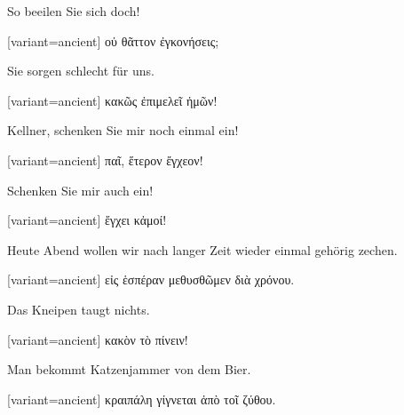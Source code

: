 So beeilen Sie sich doch!

\switchcolumn

\begin{greek}[variant=ancient]%
οὐ θᾶττον ἐγκονήσεις;

\end{greek}%
\switchcolumn*

Sie sorgen schlecht für uns.

\switchcolumn

\begin{greek}[variant=ancient]%
κακῶς ἐπιμελεῖ ἡμῶν!

\end{greek}%
\switchcolumn*

Kellner, schenken Sie mir noch einmal ein!

\switchcolumn

\begin{greek}[variant=ancient]%
παῖ, ἕτερον ἔγχεον!

\end{greek}%
\switchcolumn*

Schenken Sie mir auch ein!

\switchcolumn

\begin{greek}[variant=ancient]%
ἔγχει κἀμοί!

\end{greek}%
\switchcolumn*

Heute Abend wollen wir nach langer Zeit wieder einmal gehörig zechen.

\switchcolumn

\begin{greek}[variant=ancient]%
εἰς ἑσπέραν μεθυσθῶμεν διὰ χρόνου.

\end{greek}%
\switchcolumn*

Das Kneipen taugt nichts.

\switchcolumn

\begin{greek}[variant=ancient]%
κακὸν τὸ πίνειν!

\end{greek}%
\switchcolumn*

Man bekommt Katzenjammer von dem Bier.

\switchcolumn

\begin{greek}[variant=ancient]%
κραιπάλη γίγνεται ἀπὸ τοῖ ζύθου.

\end{greek}%
\switchcolumn*

